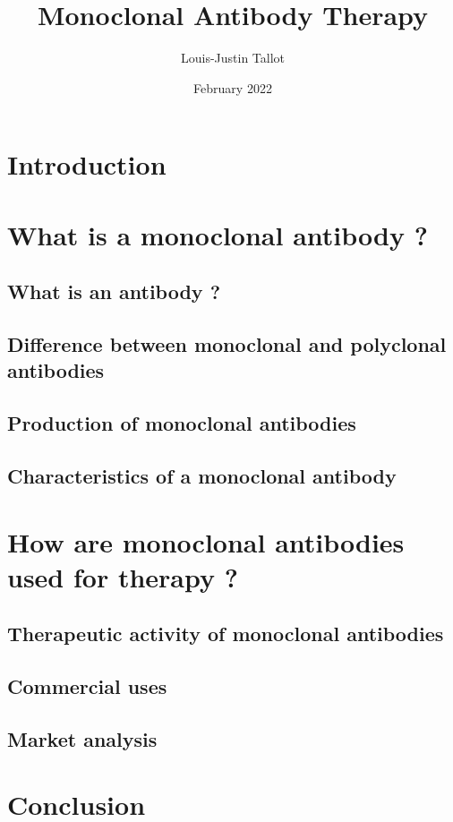 \documentclass{article}
\title{
  \textbf{Monoclonal Antibody Therapy}
}
\author{Louis-Justin Tallot}
\date{February 2022}
\begin{document}
  \maketitle

  \section*{Introduction}
  

  \section{What is a monoclonal antibody ?}

    \subsection{What is an antibody ?}
    

    \subsection{Difference between monoclonal and polyclonal antibodies}
    

    \subsection{Production of monoclonal antibodies}
    \label{sec:monoclonal_antibody_production}
    

    \subsection{Characteristics of a monoclonal antibody}
    

  \section{How are monoclonal antibodies used for therapy ?}

    \subsection{Therapeutic activity of monoclonal antibodies}
    

    \subsection{Commercial uses}
    

    \subsection{Market analysis}
    
  
  \section*{Conclusion}


  \printbibliography

  \listoffigures
\end{document}
